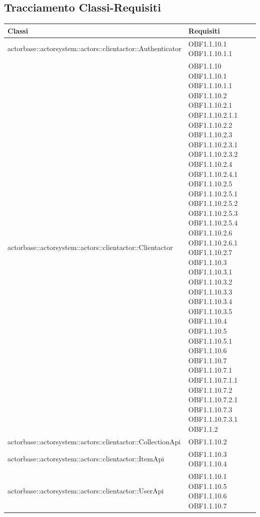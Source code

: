 \documentclass{scalatekids-article}
\begin{document}
\subsection{Tracciamento Classi-Requisiti}
\begin{longtable}[H]{|p{12cm}|p{5.5cm}|}
  \hline
  \textbf{Classi} & \textbf{Requisiti}\\
  \hline
  actorbase::actorsystem::actors::clientactor::Authenticator & \multiLineCell[t]{OBF1.1.10.1\\OBF1.1.10.1.1\\}\\
  \hline
  actorbase::actorsystem::actors::clientactor::Clientactor & \multiLineCell[t]{OBF1.1.10 OBF1.1.10.1\\OBF1.1.10.1.1 OBF1.1.10.2\\OBF1.1.10.2.1 OBF1.1.10.2.1.1\\OBF1.1.10.2.2 OBF1.1.10.2.3\\OBF1.1.10.2.3.1 OBF1.1.10.2.3.2\\OBF1.1.10.2.4 OBF1.1.10.2.4.1\\OBF1.1.10.2.5 OBF1.1.10.2.5.1\\OBF1.1.10.2.5.2 OBF1.1.10.2.5.3\\OBF1.1.10.2.5.4 OBF1.1.10.2.6\\OBF1.1.10.2.6.1 OBF1.1.10.2.7\\OBF1.1.10.3 OBF1.1.10.3.1\\OBF1.1.10.3.2 OBF1.1.10.3.3\\OBF1.1.10.3.4 OBF1.1.10.3.5\\OBF1.1.10.4 OBF1.1.10.5\\OBF1.1.10.5.1 OBF1.1.10.6\\OBF1.1.10.7 OBF1.1.10.7.1\\OBF1.1.10.7.1.1 OBF1.1.10.7.2\\OBF1.1.10.7.2.1 OBF1.1.10.7.3\\OBF1.1.10.7.3.1 OBF1.1.2\\}\\
  \hline
  actorbase::actorsystem::actors::clientactor::CollectionApi & \multiLineCell[t]{OBF1.1.10.2\\}\\
  \hline
  actorbase::actorsystem::actors::clientactor::ItemApi & \multiLineCell[t]{OBF1.1.10.3 OBF1.1.10.4\\}\\
  \hline
  actorbase::actorsystem::actors::clientactor::UserApi & \multiLineCell[t]{OBF1.1.10.1 OBF1.1.10.5\\OBF1.1.10.6 OBF1.1.10.7\\}\\

\end{longtable}
\end{document}
